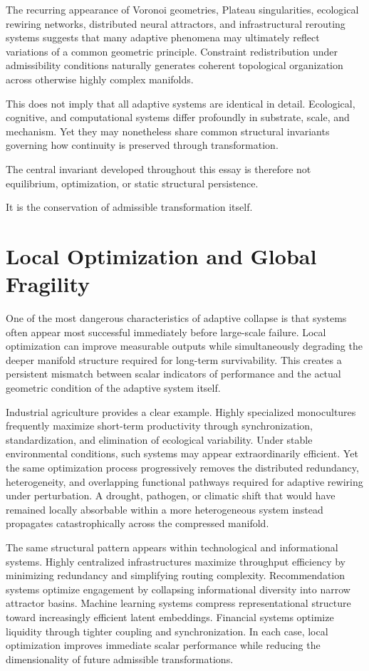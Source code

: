 \documentclass[11pt,a4paper]{article}
\begin{document}
The recurring appearance of Voronoi geometries, Plateau singularities, ecological rewiring networks, distributed neural attractors, and infrastructural rerouting systems suggests that many adaptive phenomena may ultimately reflect variations of a common geometric principle. Constraint redistribution under admissibility conditions naturally generates coherent topological organization across otherwise highly complex manifolds.

This does not imply that all adaptive systems are identical in detail. Ecological, cognitive, and computational systems differ profoundly in substrate, scale, and mechanism. Yet they may nonetheless share common structural invariants governing how continuity is preserved through transformation.

The central invariant developed throughout this essay is therefore not equilibrium, optimization, or static structural persistence.

It is the conservation of admissible transformation itself.

\newpage

\section{Local Optimization and Global Fragility}

One of the most dangerous characteristics of adaptive collapse is that systems often appear most successful immediately before large-scale failure. Local optimization can improve measurable outputs while simultaneously degrading the deeper manifold structure required for long-term survivability. This creates a persistent mismatch between scalar indicators of performance and the actual geometric condition of the adaptive system itself.

Industrial agriculture provides a clear example. Highly specialized monocultures frequently maximize short-term productivity through synchronization, standardization, and elimination of ecological variability. Under stable environmental conditions, such systems may appear extraordinarily efficient. Yet the same optimization process progressively removes the distributed redundancy, heterogeneity, and overlapping functional pathways required for adaptive rewiring under perturbation. A drought, pathogen, or climatic shift that would have remained locally absorbable within a more heterogeneous system instead propagates catastrophically across the compressed manifold.

The same structural pattern appears within technological and informational systems. Highly centralized infrastructures maximize throughput efficiency by minimizing redundancy and simplifying routing complexity. Recommendation systems optimize engagement by collapsing informational diversity into narrow attractor basins. Machine learning systems compress representational structure toward increasingly efficient latent embeddings. Financial systems optimize liquidity through tighter coupling and synchronization. In each case, local optimization improves immediate scalar performance while reducing the dimensionality of future admissible transformations.
\end{document}

